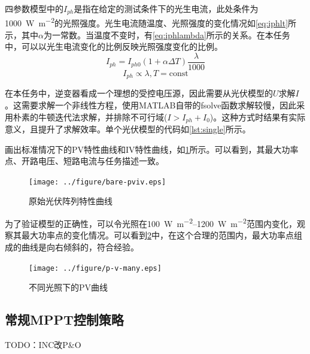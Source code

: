 \documentclass[a4paper,12pt]{article}
\begin{document}
    四参数模型中的$I_{ph}$是指在给定的测试条件下的光生电流，此处条件为\SI{1000}{\W\per\meter\squared}的光照强度。光生电流随温度、光照强度的变化情况如\cref{eq:iphlt}所示，其中$\alpha$为一常数。当温度不变时，有\cref{eq:iphlambda}所示的关系。在本任务中，可以以光生电流变化的比例反映光照强度变化的比例。
    \begin{equation}
        I_{ph}=I_{ph0}(1+\alpha \Delta T)\frac{\lambda}{1000}
        \label{eq:iphlt}
    \end{equation}
    \begin{equation}        
        I_{ph} \propto \lambda, T=\text{const}
        \label{eq:iphlambda}
    \end{equation}
    
    在本任务中，逆变器看成一个理想的受控电压源，因此需要从光伏模型的$U$求解$I$。这需要求解一个非线性方程，使用MATLAB自带的fsolve函数求解较慢，因此采用朴素的牛顿迭代法求解，并排除不可行域($I>I_{ph}+I_0$)。这种方式时结果有实际意义，且提升了求解效率。单个光伏模型的代码如\cref{lst:single}所示。
    
    
    画出标准情况下的PV特性曲线和IV特性曲线，如\cref{fig:bare-pviv}所示。可以看到，其最大功率点、开路电压、短路电流与任务描述一致。    
    \begin{figure}[htbp]
        \centering
        \texttt{[image: ../figure/bare-pviv.eps]}
        \caption{原始光伏阵列特性曲线}
        \label{fig:bare-pviv}
    \end{figure}

    为了验证模型的正确性，可以令光照在\SIrange{100}{1200}{\W\per\meter\squared}范围内变化，观察其最大功率点的变化情况。可以看到\cref{fig:p-v-many}中，在这个合理的范围内，最大功率点组成的曲线是向右倾斜的，符合经验。
    \begin{figure}[htbp]
        \centering
        \texttt{[image: ../figure/p-v-many.eps]}
        \caption{不同光照下的PV曲线}
        \label{fig:p-v-many}
    \end{figure}
    \subsection{常规MPPT控制策略} %
    \label{sub:常规mppt控制策略}
    TODO：INC改P\&O
\end{document}
